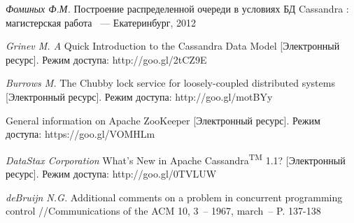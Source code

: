 \begin{thebibliography}{99}

\begin{flushleft}
\textsl{Фоминых Ф.М.} Построение распределенной очереди в условиях БД Cassandra : магистерская работа ~--- Екатеринбург, 2012
\end{flushleft}

\begin{flushleft}
\textsl{Grinev M. A} Quick Introduction to the Cassandra Data Model [Электронный ресурс]. Режим доступа: http://goo.gl/2tCZ9E
\end{flushleft}

\begin{flushleft}
\textsl{Burrows M.} The Chubby lock service for loosely-coupled distributed systems [Электронный ресурс]. Режим доступа: http://goo.gl/motBYy
\end{flushleft}

\begin{flushleft}
\textsl{} General information on Apache ZooKeeper [Электронный ресурс]. Режим доступа: https://goo.gl/VOMHLm
\end{flushleft}

\begin{flushleft}
\textsl{DataStax Corporation} What’s New in Apache Cassandra\textsuperscript{TM} 1.1? [Электронный ресурс]. Режим доступа: http://goo.gl/0TVLUW
\end{flushleft}

\begin{flushleft}
\textsl{deBruijn N.G.} Additional comments on a problem in concurrent programming control //Communications of the ACM 10, 3~-- 1967, march~-- P. 137-138
\end{flushleft}

\end{thebibliography}